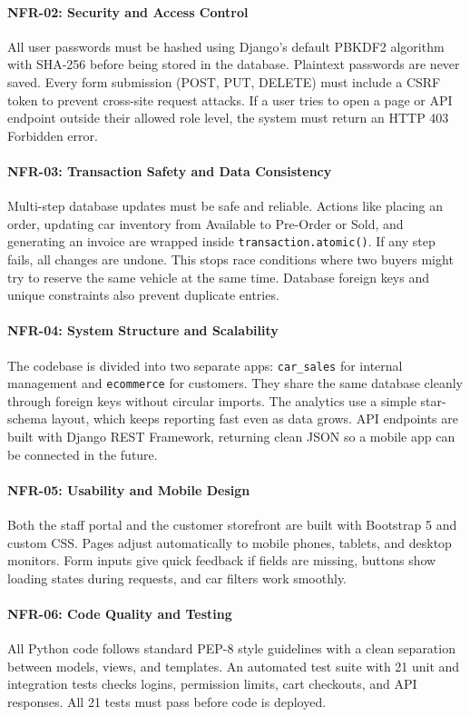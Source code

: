 \paragraph{NFR-02: Security and Access Control}
All user passwords must be hashed using Django's default PBKDF2 algorithm with SHA-256 before being stored in the database. Plaintext passwords are never saved. Every form submission (POST, PUT, DELETE) must include a CSRF token to prevent cross-site request attacks. If a user tries to open a page or API endpoint outside their allowed role level, the system must return an HTTP 403 Forbidden error.

\paragraph{NFR-03: Transaction Safety and Data Consistency}
Multi-step database updates must be safe and reliable. Actions like placing an order, updating car inventory from Available to Pre-Order or Sold, and generating an invoice are wrapped inside \texttt{transaction.atomic()}. If any step fails, all changes are undone. This stops race conditions where two buyers might try to reserve the same vehicle at the same time. Database foreign keys and unique constraints also prevent duplicate entries.

\paragraph{NFR-04: System Structure and Scalability}
The codebase is divided into two separate apps: \texttt{car\_sales} for internal management and \texttt{ecommerce} for customers. They share the same database cleanly through foreign keys without circular imports. The analytics use a simple star-schema layout, which keeps reporting fast even as data grows. API endpoints are built with Django REST Framework, returning clean JSON so a mobile app can be connected in the future.

\paragraph{NFR-05: Usability and Mobile Design}
Both the staff portal and the customer storefront are built with Bootstrap 5 and custom CSS. Pages adjust automatically to mobile phones, tablets, and desktop monitors. Form inputs give quick feedback if fields are missing, buttons show loading states during requests, and car filters work smoothly.

\paragraph{NFR-06: Code Quality and Testing}
All Python code follows standard PEP-8 style guidelines with a clean separation between models, views, and templates. An automated test suite with 21 unit and integration tests checks logins, permission limits, cart checkouts, and API responses. All 21 tests must pass before code is deployed.

